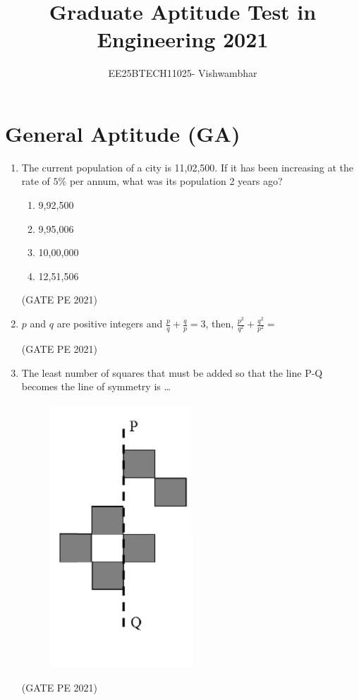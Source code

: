 \documentclass[journal,12pt,onecolumn]{IEEEtran}
\title{Graduate Aptitude Test in Engineering 2021}
\author{EE25BTECH11025- Vishwambhar}
\theoremstyle{remark}
\begin{document}
\maketitle

\section{\large\textbf{General Aptitude (GA)}}

\begin{enumerate}
\item The current population of a city is 11,02,500. If it has been increasing at the rate of $5\%$ per annum, what was its population 2 years ago?
\begin{enumerate}
    \item 9,92,500
    \item 9,95,006
    \item 10,00,000
    \item 12,51,506
\end{enumerate}
\hfill{(GATE PE 2021)}

\item $p$ and $q$ are positive integers and $\frac{p}{q}+\frac{q}{p}=3$, then, $\frac{p^2}{q^2}+\frac{q^2}{p^2}=$
\begin{enumerate}
\end{enumerate}
\hfill{(GATE PE 2021)}

\item The least number of squares that must be added so that the line P-Q becomes the line of symmetry is \dots
\begin{figure}[h]
    \centering
    \includegraphics[width=0.2\columnwidth]{Q_3.png}
    \caption{}
    \label{fig:placeholder}
\end{figure}
\begin{enumerate}
\end{enumerate}
\hfill{(GATE PE 2021)}


\end{enumerate}
\end{document}
